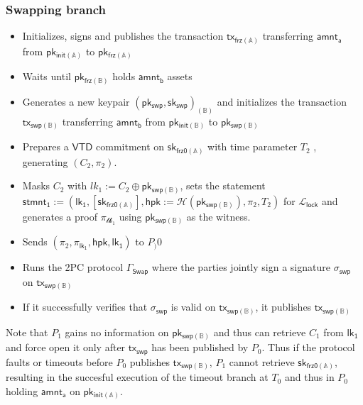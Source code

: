 \documentclass{article}      	%
\begin{document}
\subsubsection*{Swapping branch}
\begin{itemize}
    \item Initializes, signs and publishes the transaction $\mathsf{tx_{frz(\mathbb{A})}}$ transferring $\mathsf{amnt_a}$ from $\mathsf{pk_{init(\mathbb{A})}}$ to $\mathsf{pk_{frz(\mathbb{A})}}$
    \item Waits until $\mathsf{pk_{frz(\mathbb{B})}}$ holds $\mathsf{amnt_b}$ assets
    \item Generates a new keypair $(\mathsf{pk_{swp}}, \mathsf{sk_{swp}})_{(\mathbb{B})}$ and initializes the transaction $\mathsf{tx_{swp(\mathbb{B})}}$ transferring $\mathsf{amnt_b}$ from $\mathsf{pk_{init(\mathbb{B})}}$ to $\mathsf{pk_{swp(\mathbb{B})}}$
    \item Prepares a $\mathsf{VTD}$ commitment on $\mathsf{sk_{frz0(\mathbb{A})}}$ with time parameter $T_2$ , generating $(C_2, \pi_2)$.
    \item Masks $C_2$ with $lk_1 := C_2 \oplus \mathsf{pk_{swp(\mathbb{B})}}$, sets the statement $\mathsf{stmnt_1} := (\mathsf{lk_1}, {[\mathsf{sk_{frz0(\mathbb{A})}}]}, \mathsf{hpk} := \mathcal{H}(\mathsf{pk_{swp(\mathbb{B})}}), \pi_2, T_2)$ for $\mathcal{L}_{\mathsf{lock}}$ and generates a proof $\pi_{\mathcal{lk_1}}$ using $\mathsf{pk_{swp(\mathbb{B})}}$ as the witness.
    \item Sends  $(\pi_2, \pi_{\mathsf{lk_1}}, \mathsf{hpk}, \mathsf{lk_1})$ to $P_)0$
    \item Runs the 2PC protocol $\Gamma_{\mathsf{Swap}}$ where the parties jointly sign a signature $\sigma_{\mathsf{swp}}$ on $\mathsf{tx_{swp(\mathbb{B})}}$
    \item If it successfully verifies that $\sigma_{\mathsf{swp}}$ is valid on $\mathsf{tx_{swp(\mathbb{B})}}$, it publishes $\mathsf{tx_{swp(\mathbb{B})}}$
\end{itemize}

Note that $P_1$ gains no information on $\mathsf{pk_{swp(\mathbb{B})}}$ and thus can retrieve $C_1$ from $\mathsf{lk_1}$ and force open it only after $\mathsf{tx_{swp}}$ has been published by $P_0$. Thus if the protocol faults or timeouts before $P_0$ publishes $\mathsf{tx_{swp(\mathbb{B})}}$, $P_1$ cannot retrieve $\mathsf{sk_{frz0(\mathbb{A})}}$, resulting in the succesful execution of the timeout branch at $T_0$ and thus in $P_0$ holding $\mathsf{amnt_a}$ on $\mathsf{pk_{init(\mathbb{A})}}$. 
\end{document}
